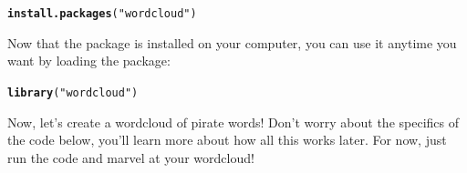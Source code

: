 \documentclass{tufte-book}\usepackage[]{graphicx}\usepackage[]{color}
\makeatletter
\newcommand{\hlstr}[1]{\textcolor[rgb]{0.192,0.494,0.8}{#1}}%
\newcommand{\hlstd}[1]{\textcolor[rgb]{0.345,0.345,0.345}{#1}}%
\newcommand{\hlkwd}[1]{\textcolor[rgb]{0.737,0.353,0.396}{\textbf{#1}}}%
\newenvironment{kframe}{%
 \def\at@end@of@kframe{}%
 \ifinner\ifhmode%
  \def\at@end@of@kframe{\end{minipage}}%
  \begin{minipage}{\columnwidth}%
 \fi\fi%
 \def\FrameCommand##1{\hskip\@totalleftmargin \hskip-\fboxsep
 \colorbox{shadecolor}{##1}\hskip-\fboxsep
     \hskip-\linewidth \hskip-\@totalleftmargin \hskip\columnwidth}%
 \MakeFramed {\advance\hsize-\width
   \@totalleftmargin\z@ \linewidth\hsize
   \@setminipage}}%
 {\par\unskip\endMakeFramed%
 \at@end@of@kframe}
\newenvironment{knitrout}{}{} %
\makeatother
\begin{document}
\begin{knitrout}
\color{fgcolor}\begin{kframe}
\begin{alltt}
\hlkwd{install.packages}\hlstd{(}\hlstr{"wordcloud"}\hlstd{)}
\end{alltt}
\end{kframe}
\end{knitrout}

Now that the package is installed on your computer, you can use it anytime you want by loading the package:

\begin{knitrout}
\color{fgcolor}\begin{kframe}
\begin{alltt}
\hlkwd{library}\hlstd{(}\hlstr{"wordcloud"}\hlstd{)}
\end{alltt}


{\ttfamily\noindent\itshape\color{messagecolor}{\#\# Loading required package: RColorBrewer}}\end{kframe}
\end{knitrout}

Now, let's create a wordcloud of pirate words! Don't worry about the specifics of the code below, you'll learn more about how all this works later. For now, just run the code and marvel at your wordcloud!
\end{document}
